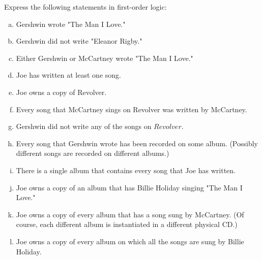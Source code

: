 \documentclass[11pt, answers]{exam}
\begin{document}
\begin{questions}
Express the following statements in first-order logic:
\begin{enumerate}[a.]
	\item Gershwin wrote "The Man I Love."
	\item Gershwin did not write "Eleanor Rigby."
	\item Either Gershwin or McCartney wrote "The Man I Love."
	\item Joe has written at least one song.
	\item Joe owns a copy of Revolver.
	\item Every song that McCartney sings on Revolver was written by McCartney.
	\item Gershwin did not write any of the songs on $Revolver$.
	\item Every song that Gershwin wrote has been recorded on some album. (Possibly different songs are recorded on different albums.)
	\item There is a single album that contains every song that Joe has written.
	\item Joe owns a copy of an album that has Billie Holiday singing "The Man I Love."
	\item Joe owns a copy of every album that has a song sung by McCartney. (Of course, each different album is instantiated in a different physical CD.)
	\item Joe owns a copy of every album on which all the songs are sung by Billie Holiday.
\end{enumerate}

\end{questions}
\end{document}
